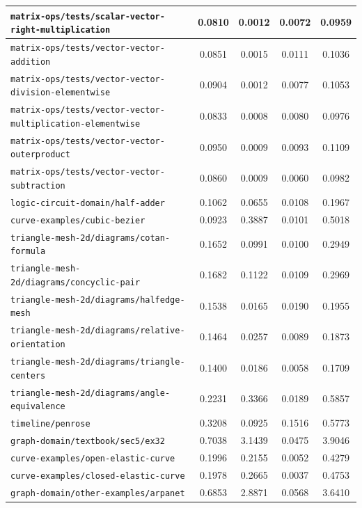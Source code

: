\begin{longtable}{|p{6.5cm}|c|c|c|c|}
    \texttt{matrix-ops/tests/scalar-vector-right-multiplication} & 0.0810 & 0.0012 & 0.0072 & 0.0959 \\ \hline
    \texttt{matrix-ops/tests/vector-vector-addition} & 0.0851 & 0.0015 & 0.0111 & 0.1036 \\ \hline
    \texttt{matrix-ops/tests/vector-vector-division-elementwise} & 0.0904 & 0.0012 & 0.0077 & 0.1053 \\ \hline
    \texttt{matrix-ops/tests/vector-vector-multiplication-elementwise} & 0.0833 & 0.0008 & 0.0080 & 0.0976 \\ \hline
    \texttt{matrix-ops/tests/vector-vector-outerproduct} & 0.0950 & 0.0009 & 0.0093 & 0.1109 \\ \hline
    \texttt{matrix-ops/tests/vector-vector-subtraction} & 0.0860 & 0.0009 & 0.0060 & 0.0982 \\ \hline
    \texttt{logic-circuit-domain/half-adder} & 0.1062 & 0.0655 & 0.0108 & 0.1967 \\ \hline
    \texttt{curve-examples/cubic-bezier} & 0.0923 & 0.3887 & 0.0101 & 0.5018 \\ \hline
    \texttt{triangle-mesh-2d/diagrams/cotan-formula} & 0.1652 & 0.0991 & 0.0100 & 0.2949 \\ \hline
    \texttt{triangle-mesh-2d/diagrams/concyclic-pair} & 0.1682 & 0.1122 & 0.0109 & 0.2969 \\ \hline
    \texttt{triangle-mesh-2d/diagrams/halfedge-mesh} & 0.1538 & 0.0165 & 0.0190 & 0.1955 \\ \hline
    \texttt{triangle-mesh-2d/diagrams/relative-orientation} & 0.1464 & 0.0257 & 0.0089 & 0.1873 \\ \hline
    \texttt{triangle-mesh-2d/diagrams/triangle-centers} & 0.1400 & 0.0186 & 0.0058 & 0.1709 \\ \hline
    \texttt{triangle-mesh-2d/diagrams/angle-equivalence} & 0.2231 & 0.3366 & 0.0189 & 0.5857 \\ \hline
    \texttt{timeline/penrose} & 0.3208 & 0.0925 & 0.1516 & 0.5773 \\ \hline
    \texttt{graph-domain/textbook/sec5/ex32} & 0.7038 & 3.1439 & 0.0475 & 3.9046 \\ \hline
    \texttt{curve-examples/open-elastic-curve} & 0.1996 & 0.2155 & 0.0052 & 0.4279 \\ \hline
    \texttt{curve-examples/closed-elastic-curve} & 0.1978 & 0.2665 & 0.0037 & 0.4753 \\ \hline
    \texttt{graph-domain/other-examples/arpanet} & 0.6853 & 2.8871 & 0.0568 & 3.6410 \\ \hline

\end{longtable}
